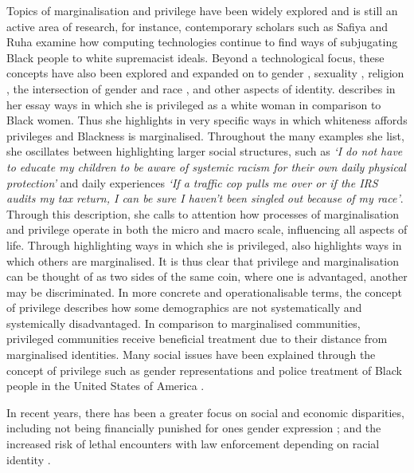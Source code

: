 Topics of marginalisation and privilege have been widely explored and is still an active area of research, for instance, contemporary scholars such as Safiya \citet{Noble:2018} and Ruha \citet{Benjamin:2019} examine how computing technologies continue to find ways of subjugating Black people to white supremacist ideals.
Beyond a technological focus, these concepts have also been explored and expanded on to gender \citep{Beauvoir:1953,Butler:1990,McIntosh:1988}, sexuality \citep{McCready:2004}, religion \citep{Beaman:2003}, the intersection of gender and race \citep{Crenshaw:1989,Voigt:2017}, and other aspects of identity.
\citet{McIntosh:1988} describes in her essay ways in which she is privileged as a white woman in comparison to Black women. Thus she highlights in very specific ways in which whiteness affords privileges and Blackness is marginalised.
Throughout the many examples she list, she oscillates between highlighting larger social structures, such as \textit{`I do not have to educate my children to be aware of systemic racism for their own daily physical protection'} and daily experiences \textit{`If a traffic cop pulls me over or if the IRS audits my tax return, I can be sure I haven't been singled out because of my race'}.
Through this description, she calls to attention how processes of marginalisation and privilege operate in both the micro and macro scale, influencing all aspects of life.
Through highlighting ways in which she is privileged, \citet{McIntosh:1988} also highlights ways in which others are marginalised.
It is thus clear that privilege and marginalisation can be thought of as two sides of the same coin, where one is advantaged, another may be discriminated.
In more concrete and operationalisable terms, the concept of privilege describes how some demographics are not systematically and systemically disadvantaged.
In comparison to marginalised communities, privileged communities receive beneficial treatment due to their distance from marginalised identities.
Many social issues have been explained through the concept of privilege such as gender representations \citep{Butler:1990} and police treatment of Black people in the United States of America \citep{Voigt:2017}.

In recent years, there has been a greater focus on social and economic disparities, including not being financially punished for ones gender expression \citep{Lombardi:2002}; and the increased risk of lethal encounters with law enforcement depending on racial identity \citep{Zack:2015}.

